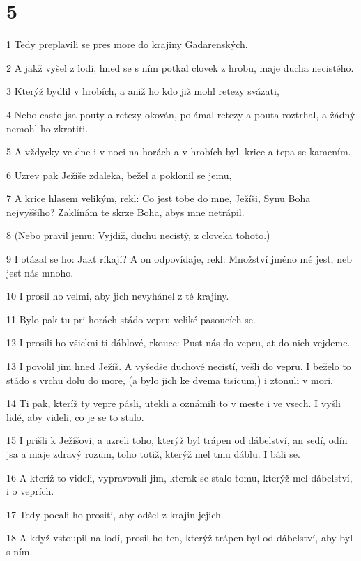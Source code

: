 \chapter{5}

\par 1 Tedy preplavili se pres more do krajiny Gadarenských.
\par 2 A jakž vyšel z lodí, hned se s ním potkal clovek z hrobu, maje ducha necistého.
\par 3 Kterýž bydlil v hrobích, a aniž ho kdo již mohl retezy svázati,
\par 4 Nebo casto jsa pouty a retezy okován, polámal retezy a pouta roztrhal, a žádný nemohl ho zkrotiti.
\par 5 A vždycky ve dne i v noci na horách a v hrobích byl, krice a tepa se kamením.
\par 6 Uzrev pak Ježíše zdaleka, bežel a poklonil se jemu,
\par 7 A krice hlasem velikým, rekl: Co jest tobe do mne, Ježíši, Synu Boha nejvyššího? Zaklínám te skrze Boha, abys mne netrápil.
\par 8 (Nebo pravil jemu: Vyjdiž, duchu necistý, z cloveka tohoto.)
\par 9 I otázal se ho: Jakt ríkají? A on odpovídaje, rekl: Množství jméno mé jest, neb jest nás mnoho.
\par 10 I prosil ho velmi, aby jich nevyhánel z té krajiny.
\par 11 Bylo pak tu pri horách stádo vepru veliké pasoucích se.
\par 12 I prosili ho všickni ti dáblové, rkouce: Pust nás do vepru, at do nich vejdeme.
\par 13 I povolil jim hned Ježíš. A vyšedše duchové necistí, vešli do vepru. I beželo to stádo s vrchu dolu do more, (a bylo jich ke dvema tisícum,) i ztonuli v mori.
\par 14 Ti pak, kteríž ty vepre pásli, utekli a oznámili to v meste i ve vsech. I vyšli lidé, aby videli, co je se to stalo.
\par 15 I prišli k Ježíšovi, a uzreli toho, kterýž byl trápen od dábelství, an sedí, odín jsa a maje zdravý rozum, toho totiž, kterýž mel tmu dáblu. I báli se.
\par 16 A kteríž to videli, vypravovali jim, kterak se stalo tomu, kterýž mel dábelství, i o veprích.
\par 17 Tedy pocali ho prositi, aby odšel z krajin jejich.
\par 18 A když vstoupil na lodí, prosil ho ten, kterýž trápen byl od dábelství, aby byl s ním.
